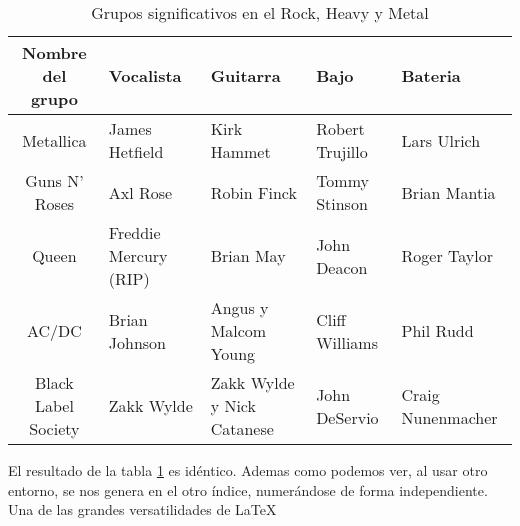 \begin{table}[H]
  \label{metal}
  \begin{center}
  \begin{tabular}{| c ||m{2.2cm}|m{2.2cm}|m{2.2cm}|m{2.2cm}|}
    \hline
    Nombre del grupo & Vocalista & Guitarra & Bajo & Bateria\\
    \hline
    Metallica & James Hetfield & Kirk Hammet & Robert Trujillo & Lars
    Ulrich\\
    \hline
    Guns N' Roses & Axl Rose & Robin Finck & Tommy Stinson & Brian
    Mantia \\
    \hline
    Queen & Freddie Mercury (RIP) & Brian May & John Deacon & Roger
    Taylor\\
    \hline
    AC/DC & Brian Johnson & Angus y Malcom Young & Cliff Williams &
    Phil Rudd\\
    \hline
    Black Label Society & Zakk Wylde & Zakk Wylde y Nick Catanese &
    John DeServio & Craig Nunenmacher\\
    \hline
  \end{tabular}
\end{center}
\caption{Grupos significativos en el Rock, Heavy y Metal}
\end{table}

El resultado de la tabla \ref{metal} es idéntico. Ademas como podemos
ver, al usar otro entorno, se nos genera en el otro índice,
numerándose de forma independiente. Una de las grandes versatilidades
de \LaTeX